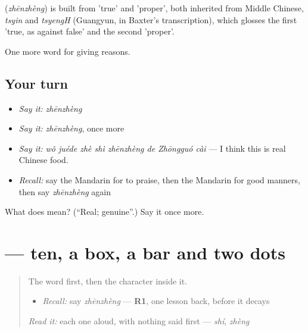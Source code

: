 \begin{cousinweb}
\textbf{} (\emph{zhēnzhèng}) is built from  'true' and  'proper', both inherited from Middle Chinese, \emph{tsyin} and \emph{tsyengH} (Guangyun, in Baxter's transcription), which glosses the first 'true, as against false' and the second 'proper'.
\end{cousinweb}

\begin{grammarlens}[title={What you've built}]
One more word for giving reasons.
\end{grammarlens}

\subsection*{Your turn}
\begin{itemize}
\raggedright
  \item \emph{Say it:} \emph{zhēnzhèng}
  \item \emph{Say it:} \emph{zhēnzhèng}, once more
  \item \emph{Say it:} \emph{wǒ juéde zhè shì zhēnzhèng de Zhōngguó cài} — I think this is real Chinese food.
  \item \emph{Recall:} say the Mandarin for to praise, then the Mandarin for good manners, then say \emph{zhēnzhèng} again
\end{itemize}

\begin{tcolorbox}[breakable,colback=teal!4,colframe=teal!35!black,title={Before you move on}]
What does  mean? (\textquotedblleft{}Real; genuine\textquotedblright{}.) Say it once more.
\end{tcolorbox}
\section[\texorpdfstring{\zh{真} (zhēn)}{真 (zhēn)}]{ — ten, a box, a bar and two dots}

\label{lesson:ZH-W358-zhen-true}



\begin{quote}
The word first, then the character inside it.

\begin{itemize}
\raggedright
  \item \emph{Recall:} say \emph{zhēnzhèng} — \textbf{R1}, one lesson back, before it decays
\end{itemize}

\begin{quote}
 
\end{quote}

\emph{Read it:} each one aloud, with nothing said first — \emph{shí}, \emph{zhèng}
\end{quote}

